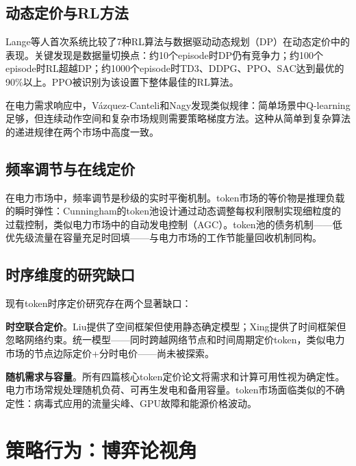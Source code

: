 \documentclass[11pt,twocolumn]{article}
\begin{document}
\subsection{动态定价与RL方法}

Lange等人\cite{lange2025reinforcement}首次系统比较了7种RL算法与数据驱动动态规划（DP）在动态定价中的表现。关键发现是数据量切换点：约10个episode时DP仍有竞争力；约100个episode时RL超越DP；约1000个episode时TD3、DDPG、PPO、SAC达到最优的90\%以上。PPO被识别为该设置下整体最佳的RL算法。

在电力需求响应中，V\'azquez-Canteli和Nagy\cite{vazquez2019reinforcement}发现类似规律：简单场景中Q-learning足够，但连续动作空间和复杂市场规则需要策略梯度方法。这种从简单到复杂算法的递进规律在两个市场中高度一致。

\subsection{频率调节与在线定价}

在电力市场中，频率调节是秒级的实时平衡机制。token市场的等价物是推理负载的瞬时弹性：Cunningham\cite{cunningham2026token}的token池设计通过动态调整每权利限制实现细粒度的过载控制，类似电力市场中的自动发电控制（AGC）。token池的债务机制——低优先级流量在容量充足时回填——与电力市场的工作节能量回收机制同构。

\subsection{时序维度的研究缺口}

现有token时序定价研究存在两个显著缺口：

\textbf{时空联合定价}。Liu\cite{liu2026locational}提供了空间框架但使用静态确定模型；Xing\cite{xing2026tokenfutures}提供了时间框架但忽略网络约束。统一模型——同时跨越网络节点和时间周期定价token，类似电力市场的节点边际定价+分时电价——尚未被探索。

\textbf{随机需求与容量}。所有四篇核心token定价论文\cite{liu2026locational,xing2026tokenfutures,guo2025prilm,zhong2026token}将需求和计算可用性视为确定性。电力市场常规处理随机负荷、可再生发电和备用容量。token市场面临类似的不确定性：病毒式应用的流量尖峰、GPU故障和能源价格波动。

\section{策略行为：博弈论视角}
\end{document}
